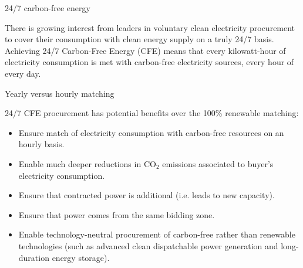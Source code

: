 \begin{frame}{24/7 carbon-free energy}

  \centering

  There is growing interest from leaders in voluntary clean
  electricity procurement to cover their consumption 
  with clean energy supply on a \alert{truly 24/7 basis}. \\
  \vspace{0.3cm}
  Achieving 24/7 Carbon-Free Energy (CFE) means that every kilowatt-hour of electricity consumption is met
  with carbon-free electricity sources, \alert{every hour of every day}.
  
\end{frame}



\begin{frame}{Yearly versus hourly matching}
  
  24/7 CFE procurement has potential benefits over the 100\% renewable matching:
  
  \begin{itemize}
  \item Ensure match of electricity consumption with carbon-free resources 
        on an \alert{hourly basis}.
  \item Enable much \alert{deeper reductions in CO$_2$ emissions} associated 
        to buyer's electricity consumption.
  \item Ensure that contracted power is \alert{additional} (i.e. leads to new capacity).
  \item Ensure that power comes from the \alert{same bidding zone}.
  \item Enable technology-neutral procurement of \alert{carbon-free} rather than renewable technologies 
        (such as advanced clean dispatchable power generation and long-duration energy storage).
  \end{itemize}
  
\end{frame}



